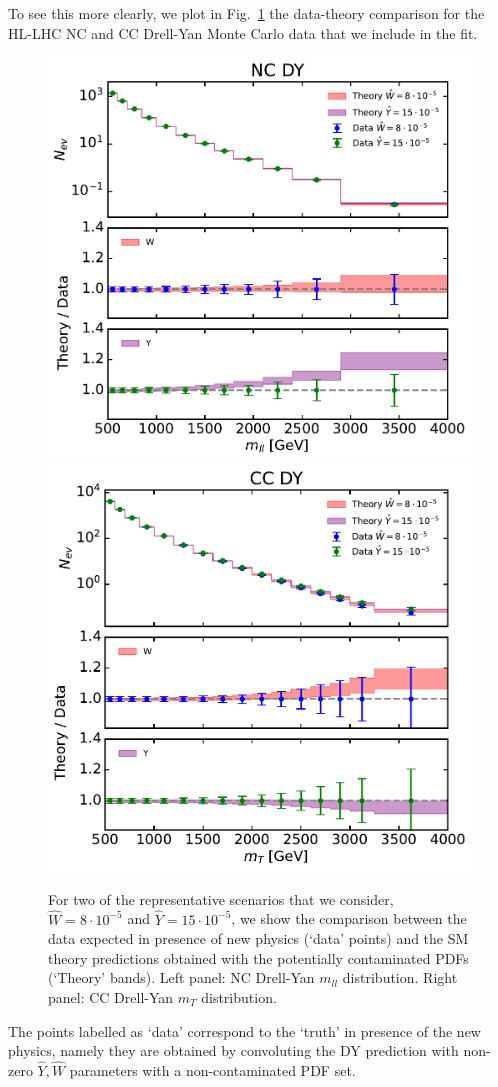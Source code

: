 \documentclass[withindex,glossary]{cam-thesis}
\begin{document}
To see this more clearly, we plot in Fig.~\ref{fig:wy_dy_prod} the data-theory comparison for the HL-LHC NC and CC Drell-Yan Monte Carlo data that we include in the fit. 
%
\begin{figure}[H]
  \begin{center}
    \includegraphics[width=0.49\linewidth]{Figures/plot_NC_DY_hllhc_W_Y_L0.pdf}
    \includegraphics[width=0.49\linewidth]{Figures/plot_CC_DY_hllhc_W_Y_L0.pdf}
  \end{center}
	  \caption{For two of the 
      representative scenarios that we consider, $\hat{W}=8\cdot 10^{-5}$ and $\hat{Y}=15\cdot 10^{-5}$, we show the comparison between the data expected in presence of new physics (`data' points) and the SM theory predictions obtained with the potentially contaminated PDFs (`Theory' bands). Left panel: NC Drell-Yan $m_{ ll}$ distribution. 
      Right panel: CC Drell-Yan $m_T$ distribution. 
    }
  \label{fig:wy_dy_prod}
\end{figure}
%
The points labelled as `data' correspond to the `truth' in presence of the new physics, namely they are obtained by convoluting the DY prediction with non-zero $\hat{Y},\hat{W}$ parameters with a non-contaminated PDF set.
\end{document}
